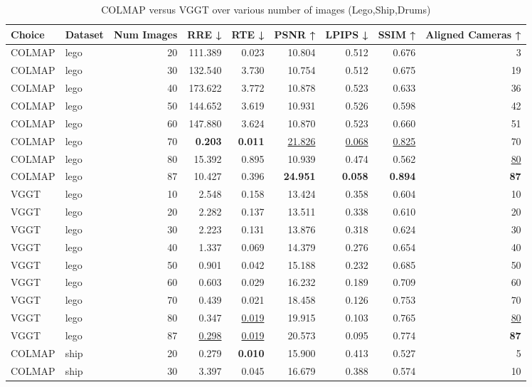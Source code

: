 \begin{table}[H]
\caption{COLMAP versus VGGT over various number of images (Lego,Ship,Drums)}
\label{tab:01_num_images_lego,ship,drums}
\small
\begin{tabular}{llrrrrrrr}
\toprule
Choice & Dataset & Num Images & RRE ↓ & RTE ↓ & PSNR ↑ & LPIPS ↓ & SSIM ↑ & Aligned Cameras ↑ \\
\midrule
COLMAP & lego & 20 & 111.389 & 0.023 & 10.804 & 0.512 & 0.676 & 3 \\
COLMAP & lego & 30 & 132.540 & 3.730 & 10.754 & 0.512 & 0.675 & 19 \\
COLMAP & lego & 40 & 173.622 & 3.772 & 10.878 & 0.523 & 0.633 & 36 \\
COLMAP & lego & 50 & 144.652 & 3.619 & 10.931 & 0.526 & 0.598 & 42 \\
COLMAP & lego & 60 & 147.880 & 3.624 & 10.870 & 0.523 & 0.660 & 51 \\
COLMAP & lego & 70 & \textbf{0.203} & \textbf{0.011} & \underline{21.826} & \underline{0.068} & \underline{0.825} & 70 \\
COLMAP & lego & 80 & 15.392 & 0.895 & 10.939 & 0.474 & 0.562 & \underline{80} \\
COLMAP & lego & 87 & 10.427 & 0.396 & \textbf{24.951} & \textbf{0.058} & \textbf{0.894} & \textbf{87} \\
VGGT & lego & 10 & 2.548 & 0.158 & 13.424 & 0.358 & 0.604 & 10 \\
VGGT & lego & 20 & 2.282 & 0.137 & 13.511 & 0.338 & 0.610 & 20 \\
VGGT & lego & 30 & 2.223 & 0.131 & 13.876 & 0.318 & 0.624 & 30 \\
VGGT & lego & 40 & 1.337 & 0.069 & 14.379 & 0.276 & 0.654 & 40 \\
VGGT & lego & 50 & 0.901 & 0.042 & 15.188 & 0.232 & 0.685 & 50 \\
VGGT & lego & 60 & 0.603 & 0.029 & 16.232 & 0.189 & 0.709 & 60 \\
VGGT & lego & 70 & 0.439 & 0.021 & 18.458 & 0.126 & 0.753 & 70 \\
VGGT & lego & 80 & 0.347 & \underline{0.019} & 19.915 & 0.103 & 0.765 & \underline{80} \\
VGGT & lego & 87 & \underline{0.298} & \underline{0.019} & 20.573 & 0.095 & 0.774 & \textbf{87} \\
\midrule
COLMAP & ship & 20 & 0.279 & \textbf{0.010} & 15.900 & 0.413 & 0.527 & 5 \\
COLMAP & ship & 30 & 3.397 & 0.045 & 16.679 & 0.388 & 0.574 & 10 \\

\end{tabular}
\end{table}
